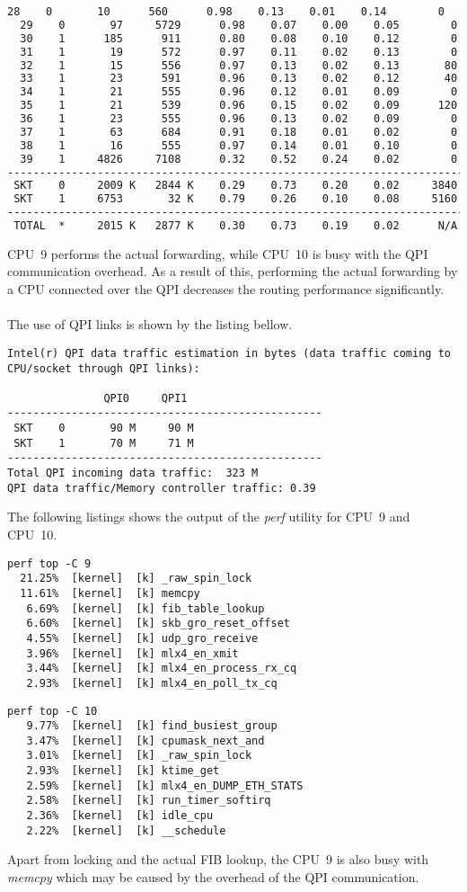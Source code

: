 \begin{lstlisting}[language=TeX]
  28    0       10      560      0.98    0.13    0.01    0.14        0
  29    0       97     5729      0.98    0.07    0.00    0.05        0
  30    1      185      911      0.80    0.08    0.10    0.12        0
  31    1       19      572      0.97    0.11    0.02    0.13        0
  32    1       15      556      0.97    0.13    0.02    0.13       80
  33    1       23      591      0.96    0.13    0.02    0.12       40
  34    1       21      555      0.96    0.12    0.01    0.09        0
  35    1       21      539      0.96    0.15    0.02    0.09      120
  36    1       23      555      0.96    0.13    0.02    0.09        0
  37    1       63      684      0.91    0.18    0.01    0.02        0
  38    1       16      555      0.97    0.14    0.01    0.10        0
  39    1     4826     7108      0.32    0.52    0.24    0.02        0
------------------------------------------------------------------------
 SKT    0     2009 K   2844 K    0.29    0.73    0.20    0.02     3840
 SKT    1     6753       32 K    0.79    0.26    0.10    0.08     5160
------------------------------------------------------------------------
 TOTAL  *     2015 K   2877 K    0.30    0.73    0.19    0.02      N/A
\end{lstlisting}
CPU~9 performs the actual forwarding, while CPU~10
is busy with the QPI communication overhead.
As a result of this, performing the actual forwarding
by a CPU connected over the QPI decreases the routing performance significantly.
\\
\\
The use of QPI links is shown by the listing bellow.
\begin{lstlisting}
Intel(r) QPI data traffic estimation in bytes (data traffic coming to CPU/socket through QPI links):

               QPI0     QPI1
-------------------------------------------------
 SKT    0       90 M     90 M
 SKT    1       70 M     71 M
-------------------------------------------------
Total QPI incoming data traffic:  323 M
QPI data traffic/Memory controller traffic: 0.39
\end{lstlisting}
The following listings shows the output of the {\it{perf}} utility for CPU~9 and CPU~10.
\begin{lstlisting}
perf top -C 9
  21.25%  [kernel]  [k] _raw_spin_lock
  11.61%  [kernel]  [k] memcpy
   6.69%  [kernel]  [k] fib_table_lookup
   6.60%  [kernel]  [k] skb_gro_reset_offset
   4.55%  [kernel]  [k] udp_gro_receive
   3.96%  [kernel]  [k] mlx4_en_xmit
   3.44%  [kernel]  [k] mlx4_en_process_rx_cq
   2.93%  [kernel]  [k] mlx4_en_poll_tx_cq
\end{lstlisting}
\begin{lstlisting}
perf top -C 10
   9.77%  [kernel]  [k] find_busiest_group
   3.47%  [kernel]  [k] cpumask_next_and
   3.01%  [kernel]  [k] _raw_spin_lock
   2.93%  [kernel]  [k] ktime_get
   2.59%  [kernel]  [k] mlx4_en_DUMP_ETH_STATS
   2.58%  [kernel]  [k] run_timer_softirq
   2.36%  [kernel]  [k] idle_cpu
   2.22%  [kernel]  [k] __schedule
\end{lstlisting}
Apart from locking and the actual FIB lookup,
the CPU~9 is also busy with {\it{memcpy}} which may be caused by the overhead of the QPI communication.
